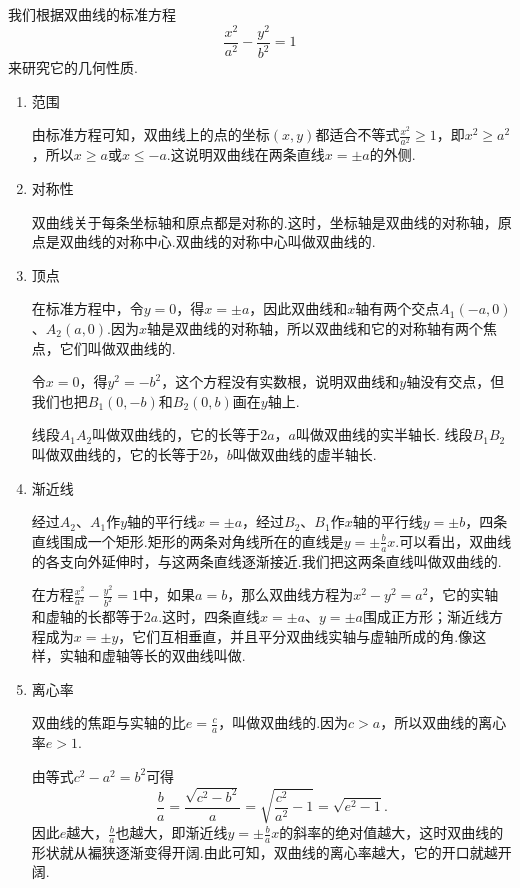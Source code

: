 我们根据双曲线的标准方程\[
\frac{x^2}{a^2} - \frac{y^2}{b^2} = 1
\]来研究它的几何性质.
\begin{enumerate}
\item 范围

由标准方程可知，双曲线上的点的坐标\((x,y)\)都适合不等式\(\frac{x^2}{a^2}\geqslant1\)，即\(x^2 \geqslant a^2\)，所以\(x \geqslant a\)或\(x \leqslant -a\).这说明双曲线在两条直线\(x = \pm a\)的外侧.

\item 对称性

双曲线关于每条坐标轴和原点都是对称的.这时，坐标轴是双曲线的对称轴，原点是双曲线的对称中心.双曲线的对称中心叫做双曲线的.

\item 顶点

在标准方程中，令\(y=0\)，得\(x = \pm a\)，因此双曲线和\(x\)轴有两个交点\(A_1(-a,0)\)、\(A_2(a,0)\).因为\(x\)轴是双曲线的对称轴，所以双曲线和它的对称轴有两个焦点，它们叫做双曲线的.

令\(x=0\)，得\(y^2=-b^2\)，这个方程没有实数根，说明双曲线和\(y\)轴没有交点，但我们也把\(B_1(0,-b)\)和\(B_2(0,b)\)画在\(y\)轴上.

线段\(A_1 A_2\)叫做双曲线的，它的长等于\(2a\)，\(a\)叫做双曲线的实半轴长.
线段\(B_1 B_2\)叫做双曲线的，它的长等于\(2b\)，\(b\)叫做双曲线的虚半轴长.

\item 渐近线

经过\(A_2\)、\(A_1\)作\(y\)轴的平行线\(x = \pm a\)，经过\(B_2\)、\(B_1\)作\(x\)轴的平行线\(y = \pm b\)，四条直线围成一个矩形.矩形的两条对角线所在的直线是\(y = \pm\frac{b}{a}x\).可以看出，双曲线的各支向外延伸时，与这两条直线逐渐接近.我们把这两条直线叫做双曲线的.

在方程\(\frac{x^2}{a^2}-\frac{y^2}{b^2}=1\)中，如果\(a=b\)，那么双曲线方程为\(x^2-y^2=a^2\)，它的实轴和虚轴的长都等于\(2a\).这时，四条直线\(x=\pm a\)、\(y=\pm a\)围成正方形；渐近线方程成为\(x=\pm y\)，它们互相垂直，并且平分双曲线实轴与虚轴所成的角.像这样，实轴和虚轴等长的双曲线叫做.

\item 离心率

双曲线的焦距与实轴的比\(e = \frac{c}{a}\)，叫做双曲线的.因为\(c > a\)，所以双曲线的离心率\(e > 1\).

由等式\(c^2-a^2=b^2\)可得\[
\frac{b}{a} = \frac{\sqrt{c^2-b^2}}{a} = \sqrt{\frac{c^2}{a^2}-1} = \sqrt{e^2-1}.
\]因此\(e\)越大，\(\frac{b}{a}\)也越大，即渐近线\(y = \pm\frac{b}{a}x\)的斜率的绝对值越大，这时双曲线的形状就从褊狭逐渐变得开阔.由此可知，双曲线的离心率越大，它的开口就越开阔.
\end{enumerate}

